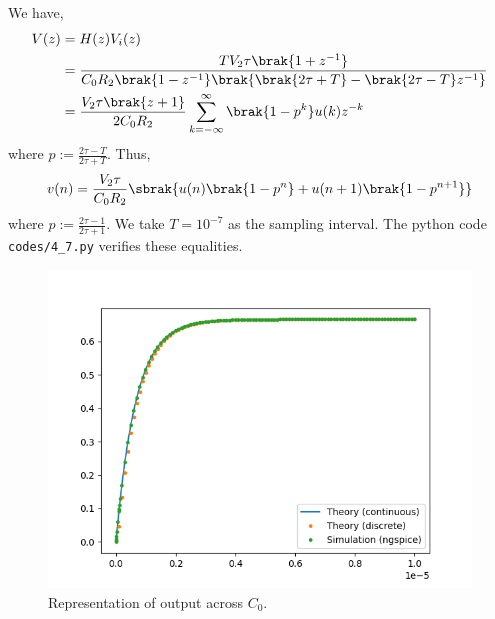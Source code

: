 \documentclass[journal,12pt,twocolumn]{IEEEtran}
\renewcommand\thesection{\arabic{section}}
\begin{document}
\begin{enumerate}[label=\arabic*.,ref=\thesection.\theenumi]
		\solution We have,
		\begin{align}
			V(z) &= H(z)V_i(z) \\
			&= \frac{TV_2\tau\brak{1+z^{-1}}}{C_0R_2\brak{1-z^{-1}}\brak{\brak{2\tau+T}-\brak{2\tau-T}z^{-1}}} \\
			&= \frac{V_2\tau\brak{z+1}}{2C_0R_2}\sum_{k=-\infty}^{\infty}\brak{1-p^k}u(k)z^{-k}
		\end{align}
		where $p := \frac{2\tau-T}{2\tau+T}$. Thus,
		\begin{align}
			v(n) = \frac{V_2\tau}{C_0R_2}\sbrak{u(n)\brak{1-p^n}+u(n+1)\brak{1-p^{n+1}}}
		\end{align}
		where $p := \frac{2\tau-1}{2\tau+1}$. We take $T = 10^{-7}$ as the
		sampling interval. The python code \texttt{codes/4\_7.py} verifies
		these equalities.
		\begin{figure}
			\includegraphics[width=\columnwidth]{figs/4_7.png}
			\caption{Representation of output across $C_0$.}
			\label{fig:vc0}
		\end{figure}
	\end{enumerate}
\end{document}
